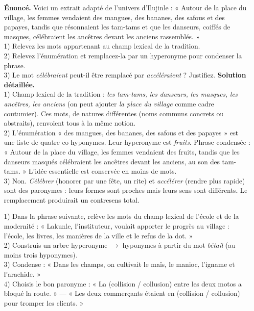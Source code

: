 \documentclass[11pt]{article}
\begin{document}
\begin{exoresolu}
\textbf{Énoncé.} Voici un extrait adapté de l'univers d'Ilujinle : « Autour de la place du village, les femmes vendaient des mangues, des bananes, des safous et des papayes, tandis que résonnaient les tam-tams et que les danseurs, coiffés de masques, célébraient les ancêtres devant les anciens rassemblés. »\\
1) Relevez les mots appartenant au champ lexical de la tradition.\\
2) Relevez l'énumération et remplacez-la par un hyperonyme pour condenser la phrase.\\
3) Le mot \emph{célébraient} peut-il être remplacé par \emph{accéléraient} ? Justifiez.
\tcblower
\textbf{Solution détaillée.}\\
1) Champ lexical de la tradition : \emph{les tam-tams, les danseurs, les masques, les ancêtres, les anciens} (on peut ajouter \emph{la place du village} comme cadre coutumier). Ces mots, de natures différentes (noms communs concrets ou abstraits), renvoient tous à la même notion.\\
2) L'énumération « des mangues, des bananes, des safous et des papayes » est une liste de quatre co-hyponymes. Leur hyperonyme est \emph{fruits}. Phrase condensée : « Autour de la place du village, les femmes vendaient des fruits, tandis que les danseurs masqués célébraient les ancêtres devant les anciens, au son des tam-tams. » L'idée essentielle est conservée en moins de mots.\\
3) Non. \emph{Célébrer} (honorer par une fête, un rite) et \emph{accélérer} (rendre plus rapide) sont des paronymes : leurs formes sont proches mais leurs sens sont différents. Le remplacement produirait un contresens total.
\end{exoresolu}

\begin{exercice}
1) Dans la phrase suivante, relève les mots du champ lexical de l'école et de la modernité : « Lakunle, l'instituteur, voulait apporter le progrès au village : l'école, les livres, les manières de la ville et le refus de la dot. »\\
2) Construis un arbre hyperonyme $\rightarrow$ hyponymes à partir du mot \emph{bétail} (au moins trois hyponymes).\\
3) Condense : « Dans les champs, on cultivait le maïs, le manioc, l'igname et l'arachide. »\\
4) Choisis le bon paronyme : « La (collision / collusion) entre les deux motos a bloqué la route. » — « Les deux commerçants étaient en (collision / collusion) pour tromper les clients. »
\end{exercice}
\end{document}
